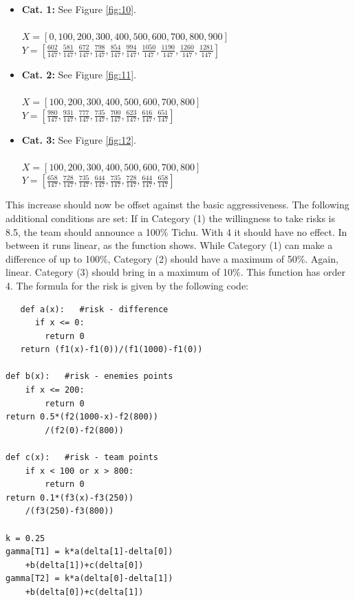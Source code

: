 \begin{itemize}
	\item \textbf{Cat. 1:} See Figure \ref{fig:10}.\\ \\
			$X=[0,100,200,300,400,500,600,700,800,900]$\\
			$Y=[\frac{602}{147},\frac{581}{147},\frac{672}{147},\frac{798}{147},\frac{854}{147},\frac{994}{147},\frac{1050}{147},\frac{1190}{147},\frac{1260}{147},\frac{1281}{147}]$ \\
	\item \textbf{Cat. 2:} See Figure \ref{fig:11}.\\ \\
			$X=[100,200,300,400,500,600,700,800]$\\
			$Y=[\frac{980}{147},\frac{931}{147},\frac{777}{147},\frac{735}{147},\frac{700}{147},\frac{623}{147},\frac{616}{147},\frac{651}{147}]$ \\
	\item \textbf{Cat. 3:} See Figure \ref{fig:12}.\\ \\
$X=[100,200,300,400,500,600,700,800]$\\
$Y=[\frac{658}{147},\frac{728}{147},\frac{735}{147},\frac{644}{147},\frac{735}{147},\frac{728}{147},\frac{644}{147},\frac{658}{147}]$ \\
\end{itemize}

This increase should now be offset against the basic aggressiveness.
The following additional conditions are set:
If in Category (1) the willingness to take risks is 8.5, the team should announce a 100$\%$ Tichu. With 4 it should have no effect.  In between it runs linear, as the function shows.
While Category (1) can make a difference of up to 100$\%$, Category (2) should have a maximum of 50$\%$. Again, linear.
Category (3) should bring in a maximum of 10$\%$. This function has order 4. The formula for the risk is given by the following code:

\begin{lstlisting}
   def a(x):   #risk - difference
      if x <= 0:
        return 0
   return (f1(x)-f1(0))/(f1(1000)-f1(0))
            
def b(x):   #risk - enemies points
    if x <= 200:
        return 0
return 0.5*(f2(1000-x)-f2(800))
		/(f2(0)-f2(800))
        
def c(x):   #risk - team points
    if x < 100 or x > 800:
        return 0
return 0.1*(f3(x)-f3(250))
	/(f3(250)-f3(800))

k = 0.25    
gamma[T1] = k*a(delta[1]-delta[0])
	+b(delta[1])+c(delta[0]) 
gamma[T2] = k*a(delta[0]-delta[1])
	+b(delta[0])+c(delta[1])

\end{lstlisting}

